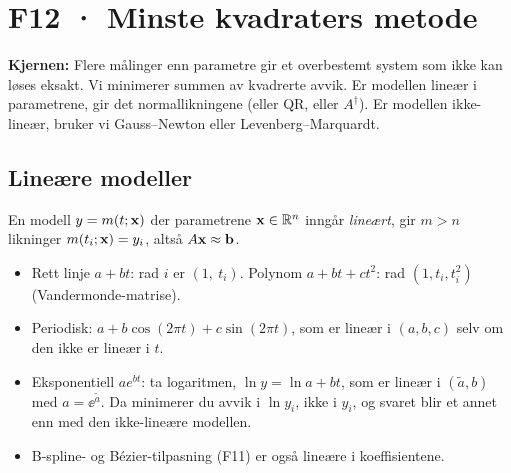 \section{F12 · Minste kvadraters metode}

\textbf{Kjernen:} Flere målinger enn parametre gir et overbestemt system som ikke kan løses eksakt. Vi minimerer summen av kvadrerte avvik. Er modellen lineær i parametrene, gir det normallikningene (eller QR, eller $A^\dagger$). Er modellen ikke-lineær, bruker vi Gauss--Newton eller Levenberg--Marquardt.

\subsection{Lineære modeller}
En modell $y=m(t;\mathbf{x})$ der parametrene $\mathbf{x}\in\mathbb{R}^n$ inngår \emph{lineært}, gir $m>n$ likninger $m(t_i;\mathbf{x})=y_i$, altså $A\mathbf{x}\approx\mathbf{b}$.
\begin{itemize}
  \item Rett linje $a+bt$: rad $i$ er $(1,\ t_i)$. Polynom $a+bt+ct^2$: rad $(1,t_i,t_i^2)$ (Vandermonde-matrise).
  \item Periodisk: $a+b\cos(2\pi t)+c\sin(2\pi t)$, som er lineær i $(a,b,c)$ selv om den ikke er lineær i $t$.
  \item Eksponentiell $ae^{bt}$: ta logaritmen, $\ln y=\ln a+bt$, som er lineær i $(\tilde a,b)$ med $a=\ee^{\tilde a}$. Da minimerer du avvik i $\ln y_i$, ikke i $y_i$, og svaret blir et annet enn med den ikke-lineære modellen.
  \item B-spline- og Bézier-tilpasning (F11) er også lineære i koeffisientene.
\end{itemize}

